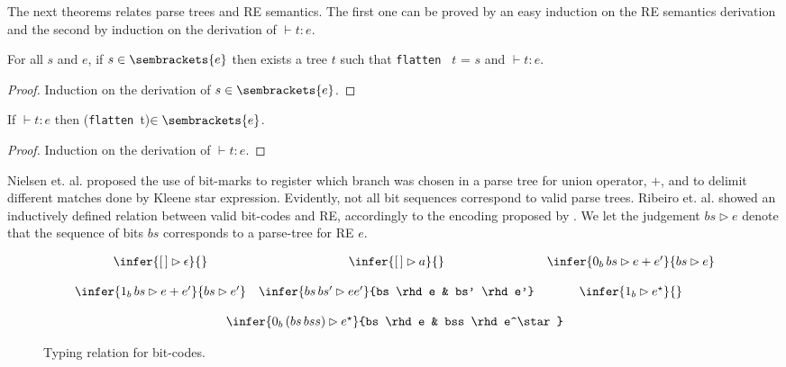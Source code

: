 The next theorems relates parse trees and RE semantics.
The first one can be proved by an easy induction on the RE semantics derivation 
and the second by induction on the derivation of $\vdash t : e$.



\begin{Theorem}
   For all $s$ and $e$, if $s \in \sembrackets{e}$ then exists a tree $t$
   such that \texttt{flatten } $t$ = $s$ and $\vdash t : e$.
\end{Theorem}
\begin{proof}
  Induction on the derivation of $s \in \sembrackets{e}$.
\end{proof}




\begin{Theorem}
If $\vdash t : e$ then (\texttt{flatten }t)$\in\sembrackets{e}$. 
\end{Theorem}
\begin{proof}
   Induction on the derivation of $\vdash t : e$.
\end{proof}



Nielsen et. al. \cite{Lasse2011} proposed the
use of bit-marks to register which branch was chosen in a parse tree for union
operator, $+$, and to delimit different matches done by Kleene star expression.
Evidently, not all bit sequences correspond to valid parse trees. Ribeiro et. al. \cite{Ribeiro2017}
showed an inductively defined relation between valid bit-codes and RE, accordingly to the encoding
proposed by \cite{Lasse2011}. We let the judgement $bs \rhd e$ denote that the sequence of bits
$bs$ corresponds to a parse-tree for RE $e$.



\begin{figure}[h]
	\[
	\begin{array}{ccc}
	\infer{[\,] \rhd \epsilon}{} &
	\infer{[\,] \rhd a}{}  &
	\infer{0_b\, bs \rhd e + e'}{bs \rhd e} \\ \\
	\infer{1_b\,bs \rhd e + e'}{bs \rhd e'} &
	\infer{bs\,bs' \rhd e e'}{bs \rhd e & bs' \rhd e'} &
	\infer{ 1_b \rhd e^\star}{} \\ \\
	\multicolumn{3}{c}{
		\infer{0_b\,(bs\,bss) \rhd e^\star}{bs \rhd e & bss \rhd e^\star}
	}
	\end{array}
	\]
	\centering
	\caption{Typing relation for bit-codes.}
	\label{figure:typing-bitcodes}
\end{figure}

